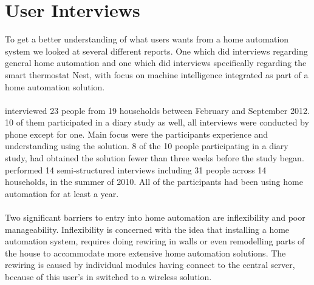 \section{User Interviews}
\label{sec:interviewReports}
To get a better understanding of what users wants from a home automation system we looked at several different reports. One \cite{HAInterviews} which did interviews regarding general home automation and one which did interviews specifically regarding the smart thermostat Nest\cite{AdaptiveInterviews}, with focus on machine intelligence integrated as part of a home automation solution. 
\\\\
\cite{AdaptiveInterviews} interviewed 23 people from 19 households between February and September 2012. 10 of them participated in a diary study as well, all interviews were conducted by phone except for one. Main focus were the participants experience and understanding using the solution. 8 of the 10 people participating in a diary study, had obtained the solution fewer than three weeks before the study began. 
\cite{HAInterviews} performed 14 semi-structured interviews including 31 people across 14 households, in the summer of 2010. All of the participants had been using  home automation for at least a year.
\\\\
Two significant barriers to entry into home automation are inflexibility and poor manageability\cite{HAInterviews}. Inflexibility is concerned with the idea that installing a home automation system, requires doing rewiring in walls or even remodelling parts of the house to accommodate more extensive home automation solutions. The rewiring is caused by individual modules having connect to the central server, because of this user's in \cite{HAInterviews} switched  to a wireless solution.
